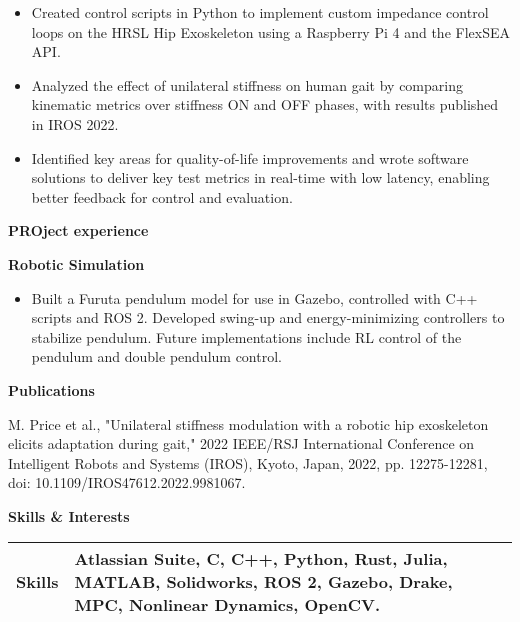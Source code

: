 \documentclass[
]{article}
\begin{document}
\begin{itemize}
\item
  Created control scripts in Python to implement custom impedance
  control loops on the HRSL Hip Exoskeleton using a Raspberry Pi 4 and
  the FlexSEA API.
\item
  Analyzed the effect of unilateral stiffness on human gait by comparing
  kinematic metrics over stiffness ON and OFF phases, with results
  published in IROS 2022.
\item
  Identified key areas for quality-of-life improvements and wrote
  software solutions to deliver key test metrics in real-time with low
  latency, enabling better feedback for control and evaluation.
\end{itemize}

\textbf{PROject experience}

\textbf{Robotic Simulation}

\begin{itemize}
\item
  Built a Furuta pendulum model for use in Gazebo, controlled with C++
  scripts and ROS 2. Developed swing-up and energy-minimizing
  controllers to stabilize pendulum. Future implementations include RL
  control of the pendulum and double pendulum control.
\end{itemize}

\textbf{Publications}

M. Price et al., "Unilateral stiffness modulation with a robotic hip
exoskeleton elicits adaptation during gait," 2022 IEEE/RSJ International
Conference on Intelligent Robots and Systems (IROS), Kyoto, Japan, 2022,
pp. 12275-12281, doi: 10.1109/IROS47612.2022.9981067.

\textbf{Skills \& Interests}

\begin{longtable}[]{@{}ll@{}}
\toprule
\endhead
\textbf{Skills} & Atlassian Suite, C, C++, Python, Rust, Julia, MATLAB,
Solidworks, ROS 2, Gazebo, Drake, MPC, Nonlinear Dynamics,
OpenCV.\tabularnewline
\bottomrule
\end{longtable}
\end{document}
